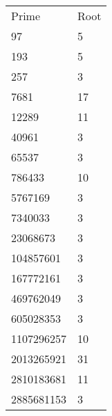 \normalsize
\begin{tabular}{ l l }
Prime & Root \\
97 & 5 \\
193 & 5 \\
257 & 3 \\
7681 & 17 \\
12289 & 11 \\
40961 & 3 \\
65537 & 3 \\
786433 & 10 \\
5767169 & 3 \\
7340033 & 3 \\
23068673 & 3 \\
104857601 & 3 \\
167772161 & 3 \\
469762049 & 3 \\
605028353 & 3 \\
1107296257 & 10 \\
2013265921 & 31 \\
2810183681 & 11 \\
2885681153 & 3
\end{tabular}
